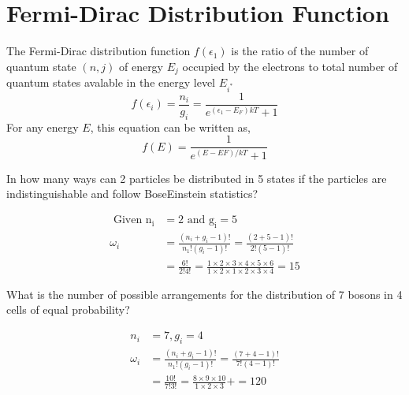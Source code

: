 \section{Fermi-Dirac Distribution Function}
The Fermi-Dirac distribution function $f\left(\epsilon_{1}\right)$ is the ratio of the number of quantum state $(n, j)$ of energy $E_{j}$ occupied by the electrons to total number of quantum states avalable in the energy level $E_{i^{*}}$
$$
f\left(\epsilon_{i}\right)=\frac{n_{i}}{g_{i}}=\frac{1}{e^{\left(\epsilon_{1}-E_{F}\right) k T}+1}
$$
For any energy $E$, this equation can be written as,
$$
f(E)=\frac{1}{e^{(E-E F) / k T}+1}
$$
\begin{exercise}
 In how many ways can 2 particles be distributed in 5 states if the particles are indistinguishable and follow BoseEinstein statistics?
 \end{exercise}
\begin{answer}
	\begin{align*}
	\text { Given } \mathrm{n}_{\mathrm{i}}&=2 \text { and } \mathrm{g}_{\mathrm{i}}=5\\
	\omega_{i} &=\frac{\left(n_{i}+g_{i}-1\right) !}{n_{1} !\left(g_{i}-1\right) !}=\frac{(2+5-1) !}{2 !(5-1) !} \\
	&=\frac{6 !}{2 ! 4 !}=\frac{1 \times 2 \times 3 \times 4 \times 5 \times 6}{1 \times 2 \times 1 \times 2 \times 3 \times 4}=15
	\end{align*}
\end{answer}
\begin{exercise}
What is the number of possible arrangements for the distribution of 7 bosons in 4 cells of equal probability?
\end{exercise}
\begin{answer}
	\begin{align*}
 n_{i}&=7, g_{i}=4\\
	\omega_{i}&=\frac{\left(n_{i}+g_{i}-1\right) !}{n_{1} !\left(g_{i}-1\right) !}=\frac{(7+4-1) !}{7 !(4-1) !}\\
	&=\frac{10 !}{7 ! 3 !}=\frac{8 \times 9 \times 10}{1 \times 2 \times 3}+=120
	\end{align*}
\end{answer}
\renewcommand*{\arraystretch}{2}
